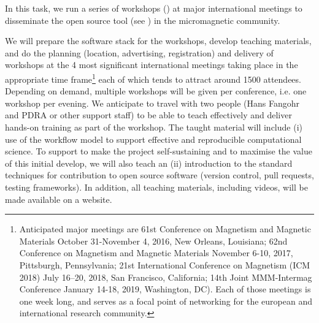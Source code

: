 \begin{workpackage}[id=dissem,wphases=18-48!.5,
  title=Dissemination,
  SARM=9,
  USORM=11,
  USHRM=8,
  USRM=24,
  UVRM=2
]
\begin{tasklist}
\begin{task}[title=\OOMMFNB{} open source dissemination workshops,
id=dissemination-of-oommf-nb-workshops]


  In this task, we run a series of workshops () at major international
  meetings to disseminate the open source \OOMMFNB{} tool (see 
) in the
  micromagnetic community.

  We will prepare the software stack for the workshops, develop
  teaching materials, and do the planning (location, advertising,
  registration) and delivery of workshops at the 4 most significant
  international meetings taking place in the appropriate time
  frame\footnote{Anticipated major meetings are 61st Conference on
    Magnetism and Magnetic Materials October 31-November 4, 2016, New
    Orleans, Louisiana; 62nd Conference on Magnetism and Magnetic
    Materials November 6-10, 2017, Pittsburgh, Pennsylvania; 21st
    International Conference on Magnetism (ICM 2018) July 16–20, 2018,
    San Francisco, California; 14th Joint MMM-Intermag Conference
    January 14-18, 2019, Washington, DC). Each of those meetings is
    one week long, and serves as a focal point of networking for the
    european and international research community.} each of which
  tends to attract around 1500 attendees. Depending on demand,
  multiple workshops will be given per conference, i.e. one workshop
  per evening. We anticipate to travel with two people (Hans Fangohr
  and PDRA or other support staff) to be able to teach effectively and
  deliver hands-on training as part of the workshop. The taught
  material will include (i) use of the \OOMMFNB{} workflow model to
  support effective and reproducible computational science.  
  To support to make the \OOMMFNB{} project self-sustaining and to
  maximise the value of this initial develop, we will also teach an
  (ii) introduction to the standard techniques for contribution to
  open source software (version control, pull requests, testing
  frameworks).  In addition, all teaching materials, including videos,
  will be made available on a website.


\end{task}
\end{tasklist}
\end{workpackage}
